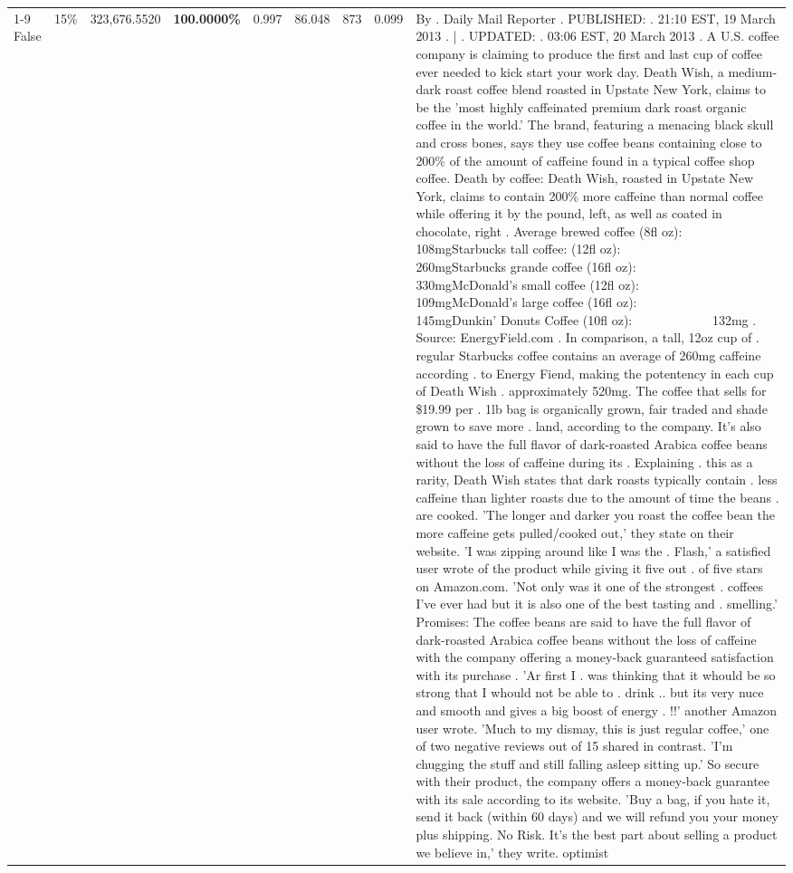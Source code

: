\begin{table}[H]
{\begin{tabular}{lllrlllll}
\cline{1-9} \cline{2-9}
False & 15\% & 323,676.5520 & \bfseries \color{red} 100.0000\% & 0.997 & 86.048 & 873 & 0.099 & By . Daily Mail Reporter . PUBLISHED: . 21:10 EST, 19 March 2013 . | . UPDATED: . 03:06 EST, 20 March 2013 . A U.S. coffee company is claiming to produce the first and last cup of coffee ever needed to kick start your work day. Death Wish, a medium-dark roast coffee blend roasted in Upstate New York, claims to be the 'most highly caffeinated premium dark roast organic coffee in the world.' The brand, featuring a menacing black skull and cross bones, says they use coffee beans containing close to 200\% of the amount of caffeine found in a typical coffee shop coffee. Death by coffee: Death Wish, roasted in Upstate New York, claims to contain 200\% more caffeine than normal coffee while offering it by the pound, left, as well as coated in chocolate, right . Average brewed coffee (8fl oz):              108mgStarbucks tall coffee: (12fl oz):                260mgStarbucks grande coffee (16fl oz):         330mgMcDonald's small coffee (12fl oz):           109mgMcDonald's large coffee (16fl oz):           145mgDunkin' Donuts Coffee (10fl oz):             132mg . Source: EnergyField.com . In comparison, a tall, 12oz cup of . regular Starbucks coffee contains an average of 260mg caffeine according . to Energy Fiend, making the potentency in each cup of Death Wish . approximately 520mg. The coffee that sells for \$19.99 per . 1lb bag is organically grown, fair traded and shade grown to save more . land, according to the company. It's also said to have the full flavor of dark-roasted Arabica coffee beans without the loss of caffeine during its . Explaining . this as a rarity, Death Wish states that dark roasts typically contain . less caffeine than lighter roasts due to the amount of time the beans . are cooked. 'The longer and darker you roast the coffee bean the more caffeine gets pulled/cooked out,' they state on their website. 'I was zipping around like I was the . Flash,' a satisfied user wrote of the product while giving it five out . of five stars on Amazon.com. 'Not only was it one of the strongest . coffees I've ever had but it is also one of the best tasting and . smelling.’ Promises: The coffee beans are said to have the full flavor of dark-roasted Arabica coffee beans without the loss of caffeine with the company offering a money-back guaranteed satisfaction with its purchase . 'Ar first I . was thinking that it whould be so strong that I whould not be able to . drink .. but its very nuce and smooth and gives a big boost of energy . !!' another Amazon user wrote. 'Much to my dismay, this is just regular coffee,' one of two negative reviews out of 15 shared in contrast. 'I'm chugging the stuff and still falling asleep sitting up.' So secure with their product, the company offers a money-back guarantee with its sale according to its website. 'Buy a bag, if you hate it, send it back (within 60 days) and we will refund you your money plus shipping. No Risk. It’s the best part about selling a product we believe in,' they write. optimist \\

\end{tabular}}
\end{table}
